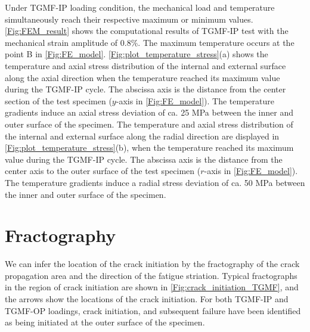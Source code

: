 \documentclass[preprint,5p,twocolumn,11pt,sort&compress]{elsarticle}
\begin{document}
Under TGMF-IP loading condition, the mechanical load and temperature simultaneously reach their respective maximum or minimum values. \autoref{Fig:FEM_result} shows the computational results of TGMF-IP test with the mechanical strain amplitude of 0.8\%. The maximum temperature occurs at the point B in \autoref{Fig:FE_model}.
\autoref{Fig:plot_temperature_stress}(a) shows the temperature and axial stress distribution of the internal and external surface along the axial direction when the temperature reached its maximum value during the TGMF-IP cycle.
The abscissa axis is the distance from the center section of the test specimen ($y$-axis in \autoref{Fig:FE_model}). The temperature gradients induce an axial stress deviation of ca. 25 MPa between the inner and outer surface of the specimen.
The temperature and axial stress distribution of the internal and external surface along the radial direction are displayed in \autoref{Fig:plot_temperature_stress}(b), when the temperature reached its maximum value during the TGMF-IP cycle.
The abscissa axis is the distance from the center axis to the outer surface of the test specimen ($r$-axis in \autoref{Fig:FE_model}).
The temperature gradients induce a radial stress deviation of ca. 50 MPa between the inner and outer surface of the specimen.




\section{Fractography}

We can infer the location of the crack initiation by the fractography of the crack propagation area and the direction of the fatigue striation.
Typical fractographs in the region of crack initiation are shown in \autoref{Fig:crack_initiation_TGMF}, and the arrows show the locations of the crack initiation. For both TGMF-IP and TGMF-OP loadings, crack initiation, and subsequent failure have been identified as being initiated at the outer surface of the specimen.
\end{document}

